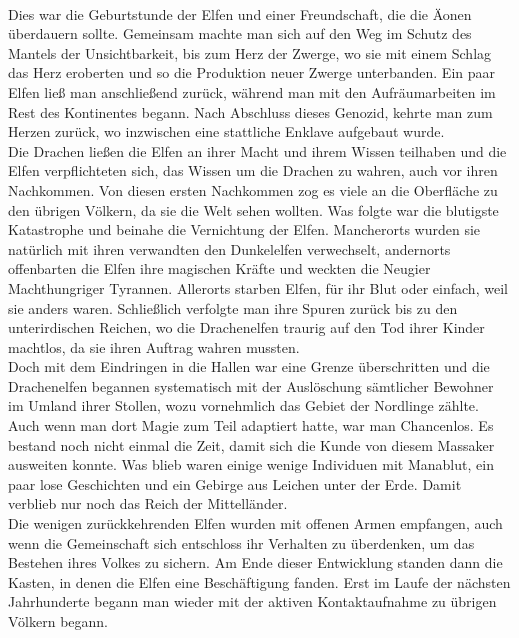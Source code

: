 \documentclass[a4paper,12pt,oneside]{book}
\begin{document}
\\Dies war die Geburtstunde der Elfen und einer Freundschaft, die die Äonen überdauern sollte. Gemeinsam machte man sich auf den Weg im Schutz des Mantels der Unsichtbarkeit, bis zum Herz der Zwerge, wo sie mit einem Schlag das Herz eroberten und so die Produktion neuer Zwerge unterbanden. Ein paar Elfen ließ man anschließend zurück, während man mit den Aufräumarbeiten im Rest des Kontinentes begann. Nach Abschluss dieses Genozid, kehrte man zum Herzen zurück, wo inzwischen eine stattliche Enklave aufgebaut wurde. 
\\Die Drachen ließen die Elfen an ihrer Macht und ihrem Wissen teilhaben und die Elfen verpflichteten sich, das Wissen um die Drachen zu wahren, auch vor ihren Nachkommen. Von diesen ersten Nachkommen zog es viele an die Oberfläche zu den übrigen Völkern, da sie die Welt sehen wollten. Was folgte war die blutigste Katastrophe und beinahe die Vernichtung der Elfen. Mancherorts wurden sie natürlich mit ihren verwandten den Dunkelelfen verwechselt, andernorts offenbarten die Elfen ihre magischen Kräfte und weckten die Neugier Machthungriger Tyrannen. Allerorts starben Elfen, für ihr Blut oder einfach, weil sie anders waren. Schließlich verfolgte man ihre Spuren zurück bis zu den unterirdischen Reichen, wo die Drachenelfen traurig auf den Tod ihrer Kinder machtlos, da sie ihren Auftrag wahren mussten.
\\Doch mit dem Eindringen in die Hallen war eine Grenze überschritten und die Drachenelfen begannen systematisch mit der Auslöschung sämtlicher Bewohner im Umland ihrer Stollen, wozu vornehmlich das Gebiet der Nordlinge zählte. Auch wenn man dort Magie zum Teil adaptiert hatte, war man Chancenlos. Es bestand noch nicht einmal die Zeit, damit sich die Kunde von diesem Massaker ausweiten konnte. Was blieb waren einige wenige Individuen mit Manablut, ein paar lose Geschichten und ein Gebirge aus Leichen unter der Erde. Damit verblieb nur noch das Reich der Mittelländer.
\\Die wenigen zurückkehrenden Elfen wurden mit offenen Armen empfangen, auch wenn die Gemeinschaft sich entschloss ihr Verhalten zu überdenken, um das Bestehen ihres Volkes zu sichern. Am Ende dieser Entwicklung standen dann die Kasten, in denen die Elfen eine Beschäftigung fanden. Erst im Laufe der nächsten Jahrhunderte begann man wieder mit der aktiven Kontaktaufnahme zu übrigen Völkern begann.
\end{document}
